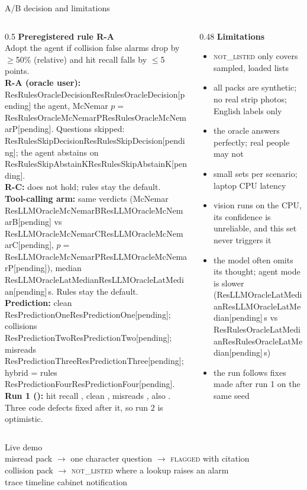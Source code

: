 \documentclass[aspectratio=169,11pt]{beamer}
\newcommand{\res}[1]{\ifcsname #1\endcsname\csname #1\endcsname\else\textcolor{brick}{[pending]}\fi}
\newif\ifRCholds
\newcommand{\V}[1]{\textsc{\lowercase{#1}}}
\newcommand{\OutcomeText}{
\textbf{\color{teal}R-A (oracle user):} \res{ResRulesOracleDecision} the agent, McNemar $p={}$\res{ResRulesOracleMcNemarP}. Questions skipped: \res{ResRulesSkipDecision}; the agent abstains on \res{ResRulesSkipAbstainK}.\\[0.5mm]
\textbf{R-C:} \ifRCholds holds: the hybrid planner gives the same labels at median \res{ResHybridOracleLatMedian}\,s vs \res{ResRulesOracleLatMedian}\,s, but p95 \res{ResHybridOracleLatPNinetyFive}\,s vs \res{ResRulesOracleLatPNinetyFive}\,s.\else does not hold; rules stay the default.\fi\\[0.5mm]
\textbf{Tool-calling arm:} same verdicts (McNemar \res{ResLLMOracleMcNemarB} vs \res{ResLLMOracleMcNemarC}, $p={}$\res{ResLLMOracleMcNemarP}), median \res{ResLLMOracleLatMedian}\,s. Rules stay the default.\\[0.5mm]
\textbf{Prediction:} clean \res{ResPredictionOne}; collisions \res{ResPredictionTwo}; misreads \res{ResPredictionThree}; hybrid = rules \res{ResPredictionFour}.\\[0.5mm]
\textbf{\color{amber}Run 1 (\RunOneCommit):} hit recall \RunOneRulesOracleHitRecallK, clean \RunOneRulesOracleCleanK, misreads \RunOneRulesOracleMisreadK, also \RunOneRulesOracleDecision. Three code defects fixed after it, so run 2 is optimistic.
}
\newcommand{\OutcomeText}{
\textcolor{brick}{Outcome pending the evaluation run.}
}
\begin{document}
\begin{frame}{A/B decision and limitations}
\begin{columns}[T]
\begin{column}{0.5\textwidth}
\footnotesize
\textbf{Preregistered rule R-A}\\
Adopt the agent if collision false alarms drop by $\geq$50\% (relative) and hit recall falls by $\leq$5 points.\\[2mm]
\OutcomeText
\end{column}
\begin{column}{0.48\textwidth}
\footnotesize
\textbf{Limitations}
\begin{itemize}\setlength{\itemsep}{1pt}
\item \V{NOT\_LISTED} only covers sampled, loaded lists
\item all packs are synthetic; no real strip photos; English labels only
\item the oracle answers perfectly; real people may not
\item small sets per scenario; laptop CPU latency
\item vision runs on the CPU, its confidence is unreliable, and this set never triggers it
\item the model often omits its thought; agent mode is slower (\res{ResLLMOracleLatMedian}\,s vs \res{ResRulesOracleLatMedian}\,s)
\item the run follows fixes made after run 1 on the same seed
\end{itemize}
\end{column}
\end{columns}
\end{frame}

\begin{frame}[standout]
Live demo\\[4mm]
{\normalsize misread pack $\rightarrow$ one character question $\rightarrow$ \V{FLAGGED} with citation\\
collision pack $\rightarrow$ \V{NOT\_LISTED} where a lookup raises an alarm\\
trace timeline \textperiodcentered{} cabinet notification}
\end{frame}

\appendix
\end{document}

